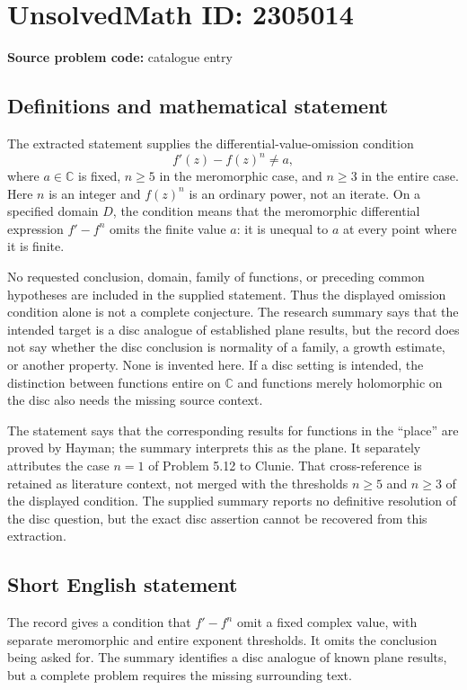 \documentclass[11pt]{article}
\newcommand{\C}{\mathbb{C}}
\begin{document}
\section*{UnsolvedMath ID: 2305014}
\textbf{Source problem code:} catalogue entry
\subsection{Definitions and mathematical statement}
The extracted statement supplies the differential-value-omission condition
\[
f'(z)-f(z)^n\ne a,
\]
where $a\in\C$ is fixed, $n\geq5$ in the meromorphic case, and $n\geq3$ in the entire case. Here $n$ is an integer and $f(z)^n$ is an ordinary power, not an iterate. On a specified domain $D$, the condition means that the meromorphic differential expression $f'-f^n$ omits the finite value $a$: it is unequal to $a$ at every point where it is finite.

No requested conclusion, domain, family of functions, or preceding common hypotheses are included in the supplied statement. Thus the displayed omission condition alone is not a complete conjecture. The research summary says that the intended target is a disc analogue of established plane results, but the record does not say whether the disc conclusion is normality of a family, a growth estimate, or another property. None is invented here. If a disc setting is intended, the distinction between functions entire on $\C$ and functions merely holomorphic on the disc also needs the missing source context.

The statement says that the corresponding results for functions in the ``place'' are proved by Hayman; the summary interprets this as the plane. It separately attributes the case $n=1$ of Problem 5.12 to Clunie. That cross-reference is retained as literature context, not merged with the thresholds $n\geq5$ and $n\geq3$ of the displayed condition. The supplied summary reports no definitive resolution of the disc question, but the exact disc assertion cannot be recovered from this extraction.
\subsection{Short English statement}
The record gives a condition that $f'-f^n$ omit a fixed complex value, with separate meromorphic and entire exponent thresholds. It omits the conclusion being asked for. The summary identifies a disc analogue of known plane results, but a complete problem requires the missing surrounding text.
\end{document}
